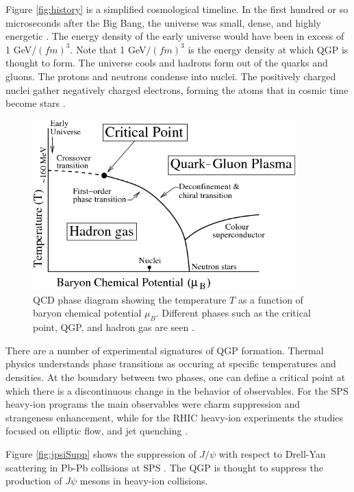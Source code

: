 Figure \ref{fig:history} is a simplified cosmological timeline. In the first hundred or so microseconds after the Big Bang, the universe was small, dense, and highly energetic \cite{Bandyopadhyay:2017wip}. The energy density of the early universe would have been in excess of 1 GeV$/(fm)^3$. Note that 1 GeV$/(fm)^3$ is the energy density at which QGP is thought to form. The universe cools and hadrons form out of the quarks and gluons. The protons and neutrons condense into nuclei. The positively charged nuclei gather negatively charged electrons, forming the atoms that in cosmic time become stars \cite{Witten:1984rs}.

\begin{figure}[h!]
\begin{centering}
\includegraphics[width=4in]{Chapter1/importfigs/byr13.png}
\par\end{centering}
\caption{QCD phase diagram showing the temperature $T$ as a function of baryon chemical potential $\mu_B$. Different phases such as the critical point, QGP, and hadron gas are seen \cite{Bhalerao:1695331}. \label{fig:QCDPhase}}
\end{figure}

There are a number of experimental signatures of QGP formation. Thermal physics understands phase transitions as occuring at specific temperatures and densities. At the boundary between two phases, one can define a critical point at which there is a discontinuous change in the behavior of observables. For the SPS heavy-ion programs the main observables were charm suppression and strangeness enhancement, while for the RHIC heavy-ion experiments the studies focused on elliptic flow, and jet quenching \cite{Gyulassy:1990ye,Matsui:1986dk,Margetis:2000sv}.

Figure \ref{fig:jpsiSupp} shows the suppression of $J/\psi$ with respect to Drell-Yan scattering in Pb-Pb collisions at SPS \cite{spsHI}. The QGP is thought to suppress the production of $J\psi$ mesons in heavy-ion collisions. 

